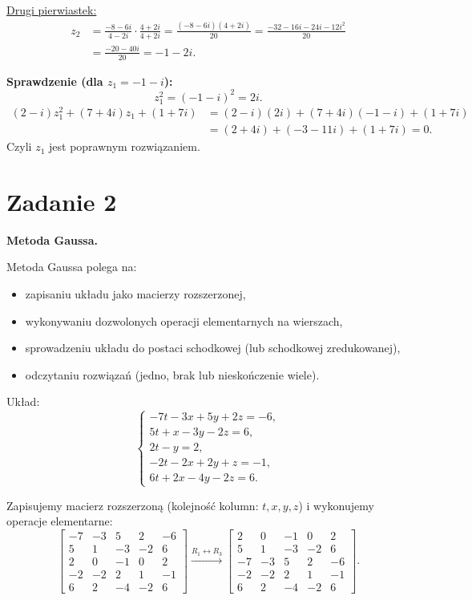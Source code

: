 \documentclass[12pt,a4paper]{article}
\begin{document}
\underline{Drugi pierwiastek:}
\begin{align*}
z_2&=\frac{-8-6i}{4-2i}\cdot\frac{4+2i}{4+2i}
=\frac{(-8-6i)(4+2i)}{20}
=\frac{-32-16i-24i-12i^2}{20}\\
&=\frac{-20-40i}{20}=-1-2i.
\end{align*}

\textbf{Sprawdzenie (dla $z_1=-1-i$):}
\[
z_1^2=(-1-i)^2=2i.
\]
\begin{align*}
(2-i)z_1^2+(7+4i)z_1+(1+7i)
&=(2-i)(2i)+(7+4i)(-1-i)+(1+7i)\\
&=(2+4i)+(-3-11i)+(1+7i)=0.
\end{align*}
Czyli $z_1$ jest poprawnym rozwiązaniem.

\section*{Zadanie 2}
\textbf{Metoda Gaussa.}

Metoda Gaussa polega na:
\begin{itemize}
\item zapisaniu układu jako macierzy rozszerzonej,
\item wykonywaniu dozwolonych operacji elementarnych na wierszach,
\item sprowadzeniu układu do postaci schodkowej (lub schodkowej zredukowanej),
\item odczytaniu rozwiązań (jedno, brak lub nieskończenie wiele).
\end{itemize}

Układ:
\[
\begin{cases}
-7t-3x+5y+2z=-6,\\
5t+x-3y-2z=6,\\
2t-y=2,\\
-2t-2x+2y+z=-1,\\
6t+2x-4y-2z=6.
\end{cases}
\]

Zapisujemy macierz rozszerzoną (kolejność kolumn: $t,x,y,z$) i wykonujemy operacje elementarne:
\[
\left[
\begin{array}{rrrr|r}
-7&-3& 5& 2&-6\\
 5& 1&-3&-2& 6\\
 2& 0&-1& 0& 2\\
-2&-2& 2& 1&-1\\
 6& 2&-4&-2& 6
\end{array}
\right]
\xrightarrow{R_1\leftrightarrow R_3}
\left[
\begin{array}{rrrr|r}
2&0&-1&0&2\\
5&1&-3&-2&6\\
-7&-3&5&2&-6\\
-2&-2&2&1&-1\\
6&2&-4&-2&6
\end{array}
\right].
\]
\end{document}
